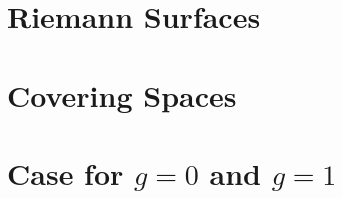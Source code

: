 \documentclass[a4paper, 8pt, notitlepage]{extreport}
\begin{document}
    

    \chapter{Riemann Surfaces}
    
    

    \chapter{Covering Spaces}
    
    

    \chapter{Case for $g=0$ and $g=1$}
    
    
    \printbibliography
\end{document}
